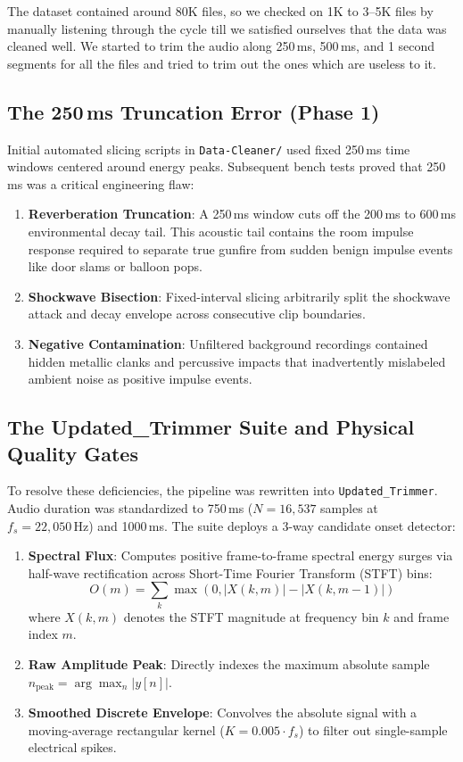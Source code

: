 \documentclass[conference]{IEEEtran}
\begin{document}
The dataset contained around 80K files, so we checked on 1K to 3--5K files by manually listening through the cycle till we satisfied ourselves that the data was cleaned well. We started to trim the audio along 250\,ms, 500\,ms, and 1 second segments for all the files and tried to trim out the ones which are useless to it.

\subsection{The 250\,ms Truncation Error (Phase 1)}
Initial automated slicing scripts in \texttt{Data-Cleaner/} used fixed 250\,ms time windows centered around energy peaks. Subsequent bench tests proved that 250\,ms was a critical engineering flaw:
\begin{enumerate}
    \item \textbf{Reverberation Truncation}: A 250\,ms window cuts off the 200\,ms to 600\,ms environmental decay tail. This acoustic tail contains the room impulse response required to separate true gunfire from sudden benign impulse events like door slams or balloon pops.
    \item \textbf{Shockwave Bisection}: Fixed-interval slicing arbitrarily split the shockwave attack and decay envelope across consecutive clip boundaries.
    \item \textbf{Negative Contamination}: Unfiltered background recordings contained hidden metallic clanks and percussive impacts that inadvertently mislabeled ambient noise as positive impulse events.
\end{enumerate}

\subsection{The Updated\_Trimmer Suite and Physical Quality Gates}
To resolve these deficiencies, the pipeline was rewritten into \texttt{Updated\_Trimmer}. Audio duration was standardized to 750\,ms ($N = 16{,}537$ samples at $f_s = 22{,}050\,\text{Hz}$) and 1000\,ms. The suite deploys a 3-way candidate onset detector:
\begin{enumerate}
    \item \textbf{Spectral Flux}: Computes positive frame-to-frame spectral energy surges via half-wave rectification across Short-Time Fourier Transform (STFT) bins:
    \begin{equation}
        O(m) = \sum_{k} \max\left(0, |X(k, m)| - |X(k, m-1)|\right)
        \label{eq:spectral_flux}
    \end{equation}
    where $X(k, m)$ denotes the STFT magnitude at frequency bin $k$ and frame index $m$.
    \item \textbf{Raw Amplitude Peak}: Directly indexes the maximum absolute sample $n_{\text{peak}} = \arg\max_n |y[n]|$.
    \item \textbf{Smoothed Discrete Envelope}: Convolves the absolute signal with a moving-average rectangular kernel ($K = 0.005 \cdot f_s$) to filter out single-sample electrical spikes.
\end{enumerate}
\end{document}
